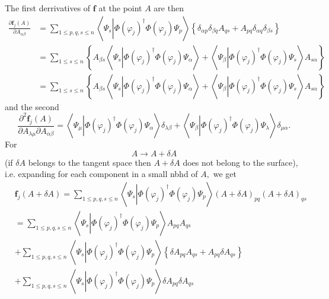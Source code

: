 \documentclass[aps,preprint]{revtex4}%
\begin{document}
The first derrivatives of $\boldsymbol{f}$ at the point $A$ are then
\begin{align}
\frac{\partial\boldsymbol{f}_{j}\left(  A\right)  }{\partial A_{\alpha\beta}}
&  =\sum_{1\leq p,q,s\leq n}\left\langle \Psi_{s}\left\vert \Phi\left(
\varphi_{j}\right)  ^{\dagger}\Phi\left(  \varphi_{j}\right)  \Psi_{p}\right.
\right\rangle \left\{  \delta_{\alpha p}\delta_{\beta q}A_{qs}+A_{pq}%
\delta_{\alpha q}\delta_{\beta s}\right\} \\
&  =\sum_{1\leq s\leq n}\left\{  A_{\beta s}\left\langle \Psi_{s}\left\vert
\Phi\left(  \varphi_{j}\right)  ^{\dagger}\Phi\left(  \varphi_{j}\right)
\Psi_{\alpha}\right.  \right\rangle +\left\langle \Psi_{\beta}\left\vert
\Phi\left(  \varphi_{j}\right)  ^{\dagger}\Phi\left(  \varphi_{j}\right)
\Psi_{s}\right.  \right\rangle A_{s\alpha}\right\} \\
&  =\sum_{1\leq s\leq n}\left\{  A_{\beta s}\left\langle \Psi_{s}\left\vert
\Phi\left(  \varphi_{j}\right)  ^{\dagger}\Phi\left(  \varphi_{j}\right)
\Psi_{\alpha}\right.  \right\rangle +\left\langle \Psi_{\beta}\left\vert
\Phi\left(  \varphi_{j}\right)  ^{\dagger}\Phi\left(  \varphi_{j}\right)
\Psi_{s}\right.  \right\rangle A_{s\alpha}\right\}
\end{align}
and the second
\begin{equation}
\frac{\partial^{2}\boldsymbol{f}_{j}\left(  A\right)  }{\partial A_{\lambda
\mu}\partial A_{\alpha\beta}}=\left\langle \Psi_{\mu}\left\vert \Phi\left(
\varphi_{j}\right)  ^{\dagger}\Phi\left(  \varphi_{j}\right)  \Psi_{\alpha
}\right.  \right\rangle \delta_{\lambda\beta}+\left\langle \Psi_{\beta
}\left\vert \Phi\left(  \varphi_{j}\right)  ^{\dagger}\Phi\left(  \varphi
_{j}\right)  \Psi_{\lambda}\right.  \right\rangle \delta_{\mu\alpha}.
\end{equation}
For
\begin{equation}
A\rightarrow A+\delta A
\end{equation}
(if $\delta A$ belongs to the tangent space then $A+\delta A$ does not belong
to the surface), i.e. expanding for each component in a small nbhd of $A,$ we
get
\begin{align}
&  \boldsymbol{f}_{j}\left(  A+\delta A\right)  =\sum_{1\leq p,q,s\leq
n}\left\langle \Psi_{s}\left\vert \Phi\left(  \varphi_{j}\right)  ^{\dagger
}\Phi\left(  \varphi_{j}\right)  \Psi_{p}\right.  \right\rangle \left(
A+\delta A\right)  _{pq}\left(  A+\delta A\right)  _{qs}\\
&  =\sum_{1\leq p,q,s\leq n}\left\langle \Psi_{s}\left\vert \Phi\left(
\varphi_{j}\right)  ^{\dagger}\Phi\left(  \varphi_{j}\right)  \Psi_{p}\right.
\right\rangle A_{pq}A_{qs}\\
&  +\sum_{1\leq p,q,s\leq n}\left\langle \Psi_{s}\left\vert \Phi\left(
\varphi_{j}\right)  ^{\dagger}\Phi\left(  \varphi_{j}\right)  \Psi_{p}\right.
\right\rangle \left\{  \delta A_{pq}A_{qs}+A_{pq}\delta A_{qs}\right\} \\
&  +\sum_{1\leq p,q,s\leq n}\left\langle \Psi_{s}\left\vert \Phi\left(
\varphi_{j}\right)  ^{\dagger}\Phi\left(  \varphi_{j}\right)  \Psi_{p}\right.
\right\rangle \delta A_{pq}\delta A_{qs}%
\end{align}
\end{document}
